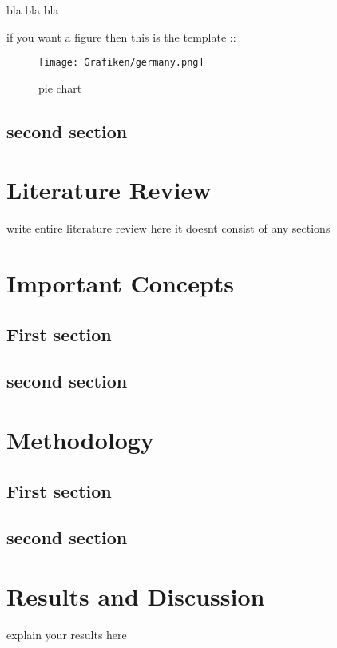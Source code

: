 \documentclass[a4paper,11pt]{report}%
\renewcommand{\\}{\vspace*{0.5\baselineskip} \newline}
\begin{document}
bla bla bla 

if you want a figure then this is the template ::
\begin{figure}[h]
\centering
	\texttt{[image: Grafiken/germany.png]}\\
	\begin{footnotesize}
		\caption[this is the caption of the image]{pie chart}
		\label{de}
	\end{footnotesize}
\end{figure}

\section{second section}

\newpage

\chapter{Literature Review}
write entire literature review here
it doesnt consist of any sections

\newpage

\chapter{Important Concepts}
\section{First section}
\section{second section}

\newpage
\chapter{Methodology}
\section{First section}
\section{second section}

\newpage
\chapter{Results and Discussion}
explain your results here
\end{document}
